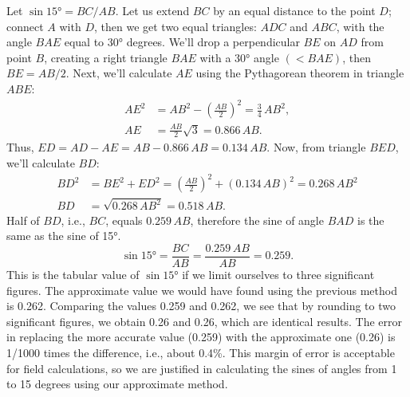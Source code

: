 Let $\sin \ang{15} = BC/AB$. Let us extend $BC$ by an equal distance to the point $D$; connect $A$ with $D$, then we get two equal triangles: $ADC$ and $ABC$, with the angle $BAE$ equal to \ang{30} degrees. We'll drop a perpendicular $BE$ on $AD$ from point $B$, creating a right triangle $BAE$ with a \ang{30} angle $(< BAE)$, then $BE = AB/2$. Next, we'll calculate $AE$ using the Pythagorean theorem in triangle $ABE$:
\begin{align*}%
AE^{2} & = AB^{2} - \left(\frac{AB}{2} \right)^{2}= \frac{3}{4}\, AB^{2},\\
AE & = \frac{AB}{2} \sqrt{3} = 0.866 \, AB.
\end{align*}
Thus, $ED = AD - AE = AB - 0.866 \, AB = 0.134 \,AB$. Now, from triangle $BED$, we'll calculate $BD$:
\begin{align*}%
BD^{2} & = BE^{2} + ED^{2} = \left(\frac{AB}{2} \right)^{2} + (0.134\,AB)^{2} = 0.268\, AB^{2}\\
BD & = \sqrt{0.268\,AB^{2}} = 0.518 \, AB.
\end{align*}
Half of $BD$, i.e., $BC$, equals $0.259\, AB$, therefore the sine of angle $BAD$ is the same as the sine of \ang{15}.
\begin{equation*}%
\sin \ang{15} = \frac{BC}{AB} = \frac{0.259 \,AB}{AB} = 0.259.
\end{equation*}
This is the tabular value of $\sin \ang{15}$ if we limit ourselves to three significant figures. The approximate value we would have found using the previous method is 0.262. Comparing the values 0.259 and 0.262, we see that by rounding to two significant figures, we obtain 0.26 and 0.26, which are identical results. The error in replacing the more accurate value (0.259) with the approximate one (0.26) is 1/1000 times the difference, i.e., about 0.4\%. This margin of error is acceptable for field calculations, so we are justified in calculating the sines of angles from 1 to 15 degrees using our approximate method.

